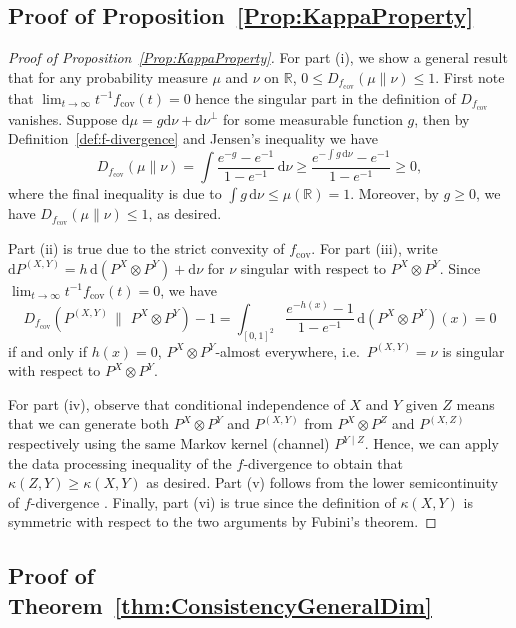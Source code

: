 \documentclass[11pt]{article}
\begin{document}
\subsection{Proof of Proposition~\ref{Prop:KappaProperty}}
\begin{proof}[Proof of Proposition~\ref{Prop:KappaProperty}]
For part (i), we show a general result that for any probability measure $\mu$ and $\nu$ on $\mathbb{R}$, $0 \leq D_{f_\mathrm{cov}}(\mu \| \nu) \leq 1$. First note that $\lim_{t\to\infty} t^{-1}f_{\mathrm{cov}}(t) = 0$ hence the singular part in the definition of $D_{f_{\mathrm{cov}}}$ vanishes. Suppose $\mathrm{d}\mu = g \mathrm{d}\nu + \mathrm{d}\nu^{\perp}$ for some measurable function $g$, then by Definition~\ref{def:f-divergence} and Jensen's inequality we have 
\[
D_{f_{\mathrm{cov}}}(\mu \| \nu) = \int \frac{e^{-g} - e^{-1}}{1 - e^{-1}} \, \mathrm{d} \nu \geq \frac{e^{-\int g \, \mathrm{d}\nu} - e^{-1}}{1-e^{-1}} \geq 0, 
\]
where the final inequality is due to $\int g \, \mathrm{d}\nu \leq \mu(\mathbb{R}) = 1$. Moreover, by $ g\geq 0$, we have $D_{f_{\mathrm{cov}}}(\mu \| \nu) \leq 1$, as desired. 

Part (ii) is true due to the strict convexity of $f_{\mathrm{cov}}$. For part (iii), write $ \mathrm{d}P^{(X,Y)} = h\, \mathrm{d}(P^X\otimes P^Y) + \mathrm{d}\nu$ for $\nu$ singular with respect to $P^X\otimes P^Y$. Since $\lim_{t\to\infty} t^{-1}f_{\mathrm{cov}}(t) = 0$, we have 
\[  
D_{f_\mathrm{cov}}(P^{(X,Y)}\,\|\,\,P^X\otimes P^Y) - 1 = \int_{[0,1]^2} \frac{e^{-h(x)}-1}{1-e^{-1}}\,\mathrm{d}(P^X\otimes P^Y)(x) = 0
\]
if and only if $h(x) = 0$, $P^X\otimes P^Y$-almost everywhere, i.e.\ $P^{(X,Y)} = \nu$ is singular with respect to $P^X\otimes P^Y$. 

For part (iv), observe that conditional independence of $X$ and $Y$ given $Z$ means that we can generate both $P^X\otimes P^Y$ and $P^{(X,Y)}$ from $P^X\otimes P^Z$ and $P^{(X,Z)}$ respectively using the same Markov kernel (channel) $P^{Y\mid Z}$. Hence, we can apply the data processing inequality \citep[Theorem~7.4]{polyanskiy2024information} of the $f$-divergence to obtain that $\kappa(Z,Y)\geq \kappa(X,Y)$ as desired. Part (v) follows from the lower semicontinuity of $f$-divergence \citep[Theorem~4.9]{polyanskiy2024information}. Finally, part (vi) is true since the definition of $\kappa(X,Y)$ is symmetric with respect to the two arguments by Fubini's theorem.
\end{proof}



\subsection{Proof of Theorem~\ref{thm:ConsistencyGeneralDim}}
\end{document}

